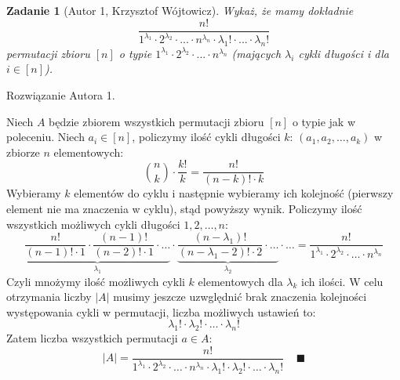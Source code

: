 \documentclass{mwart}
\newtheorem{zad}{Zadanie}[section]
\begin{document}
\begin{zad}[Autor 1, Krzysztof Wójtowicz]
    Wykaż, że mamy dokładnie
    \[\frac{n!}{1^{\lambda_1} \cdot 2^{\lambda_2} \cdot  ... \cdot n^{\lambda_n} \cdot \lambda_1! \cdot ... \cdot \lambda_n!}\]
    permutacji zbioru $[n]$ o typie $1^{\lambda_1} \cdot 2^{\lambda_2} \cdot ... \cdot n^{\lambda_n} $  (mających $\lambda_i$ cykli długości i dla $i \in [n]$).
\end{zad}
\begin{mdframed}
    Rozwiązanie Autora 1.
\end{mdframed}
\begin{mdframed}
    Niech $A$ będzie zbiorem wszystkich permutacji zbioru $[n]$ o typie jak w poleceniu.
    Niech $a_i \in [n]$, policzymy ilość cykli długości $k$: $(a_1,a_2,\ldots,a_k)$ w zbiorze $n$ elementowych:
    \[\binom{n}{k} \cdot \frac{k!}{k} = \frac{n!}{(n-k)! \cdot k}\]
    Wybieramy $k$ elementów do cyklu i następnie wybieramy ich kolejność (pierwszy element
    nie ma znaczenia w cyklu), stąd powyższy wynik.
    \newline \newline
    Policzymy ilość wszystkich możliwych cykli długości $1,2,\ldots,n$:
    \[\underbrace{\frac{n!}{(n-1)! \cdot 1} \cdot \frac{(n-1)!}{(n-2)! \cdot 1} \cdot \ldots}_{\lambda_1} \cdot
        \underbrace{\frac{(n-\lambda_1)!}{(n-\lambda_1-2)! \cdot 2} \cdot \ldots}_{\lambda_2} \cdot \ldots =
        \frac{n!}{1^{\lambda_1} \cdot 2^{\lambda_2} \cdot \ldots \cdot n^{\lambda_n}} \]
    Czyli mnożymy ilość możliwych cykli $k$ elementowych dla $\lambda_k$ ich ilości.
    \newline \newline
    W celu otrzymania liczby $|A|$ musimy jeszcze uzwględnić brak znaczenia kolejności
    występowania cykli w permutacji, liczba możliwych ustawień to:
    \[{\lambda_1}! \cdot {\lambda_2}! \cdot \ldots \cdot {\lambda_n}!\]
    Zatem liczba wszystkich permutacji $a \in A$:
    \[|A| = \frac{n!}{1^{\lambda_1} \cdot 2^{\lambda_2} \cdot \ldots \cdot n^{\lambda_n}
            \cdot {\lambda_1}! \cdot {\lambda_2}! \cdot \ldots \cdot {\lambda_n}!} \; \; \; \; \blacksquare\]
\end{mdframed}
\end{document}
